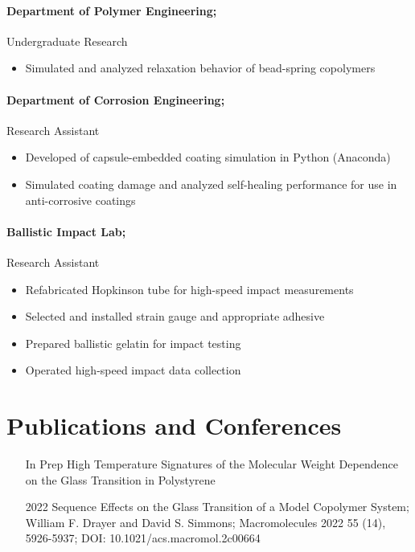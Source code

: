 \documentclass{my_cv}
\begin{document}
\paragraph{Department of Polymer Engineering;}
Undergraduate Research
\begin{itemize}
    \item Simulated and analyzed relaxation behavior of bead-spring co\-polymers
\end{itemize}

\paragraph{Department of Corrosion Engineering;}
Research Assistant
\begin{itemize}
    \item Developed of capsule-embedded coating simulation in Python (Anaconda)
    \item Simulated coating damage and analyzed self-healing performance for use in anti-corrosive coatings
\end{itemize}

\paragraph{Ballistic Impact Lab;}
Research Assistant
\begin{itemize}
    \item Re\-fabricated Hopkins\-on tube for high-speed impact measurements
    \item Selected and installed strain gauge and appropriate adhesive
    \item Prepared ballistic gelatin for impact testing
    \item Operated high-speed impact data collection
\end{itemize}

\section{Publications and Conferences}
\begin{itemize}
    \item[In Prep] High Temperature Signatures of the Molecular Weight Dependence on the Glass Transition in Polystyrene
    \item[2022] Sequence Effects on the Glass Transition of a Model Co\-polymer System; William F. Drayer and David S. Simmons; Macromolecules 2022 55 (14), 5926-5937; DOI: 10.1021/acs.macromol.2c00664
\end{itemize}
\end{document}
